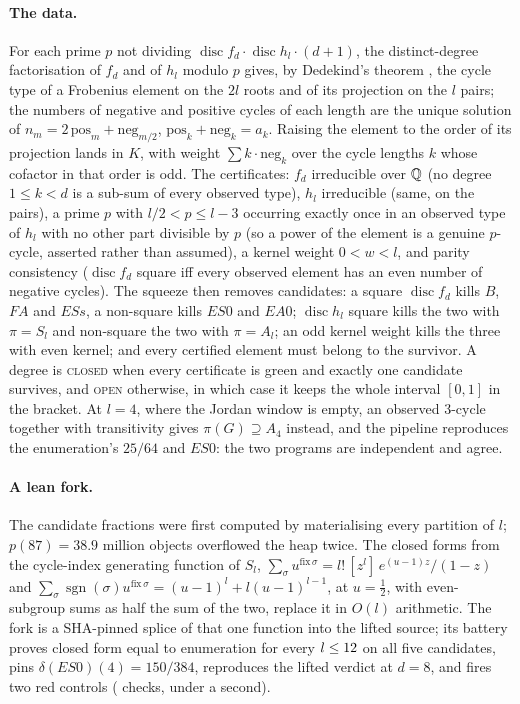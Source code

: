 \documentclass[11pt]{article}
\DeclareMathOperator{\disc}{disc}
\begin{document}
\paragraph{The data.} For each prime $p$ not dividing $\disc f_d\cdot\disc h_l\cdot(d+1)$, the distinct-degree factorisation of $f_d$ and of $h_l$ modulo $p$ gives, by Dedekind's theorem \cite[Ch.~13]{Cox}, the cycle type of a Frobenius element on the $2l$ roots and of its projection on the $l$ pairs; the numbers of negative and positive cycles of each length are the unique solution of $n_m=2\,\mathrm{pos}_m+\mathrm{neg}_{m/2}$, $\mathrm{pos}_k+\mathrm{neg}_k=a_k$. Raising the element to the order of its projection lands in $K$, with weight $\sum k\cdot\mathrm{neg}_k$ over the cycle lengths $k$ whose cofactor in that order is odd. The certificates: $f_d$ irreducible over $\mathbb{Q}$ (no degree $1\le k<d$ is a sub-sum of every observed type), $h_l$ irreducible (same, on the pairs), a prime $p$ with $l/2<p\le l-3$ occurring exactly once in an observed type of $h_l$ with no other part divisible by $p$ (so a power of the element is a genuine $p$-cycle, asserted rather than assumed), a kernel weight $0<w<l$, and parity consistency ($\disc f_d$ square iff every observed element has an even number of negative cycles). The squeeze then removes candidates: a square $\disc f_d$ kills $B$, $FA$ and $ESs$, a non-square kills $ES0$ and $EA0$; $\disc h_l$ square kills the two with $\pi=S_l$ and non-square the two with $\pi=A_l$; an odd kernel weight kills the three with even kernel; and every certified element must belong to the survivor. A degree is \textsc{closed} when every certificate is green and exactly one candidate survives, and \textsc{open} otherwise, in which case it keeps the whole interval $[0,1]$ in the bracket. At $l=4$, where the Jordan window is empty, an observed 3-cycle together with transitivity gives $\pi(G)\supseteq A_4$ instead, and the pipeline reproduces the enumeration's $25/64$ and $ES0$: the two programs are independent and agree.

\paragraph{A lean fork.} The candidate fractions were first computed by materialising every partition of $l$; $p(87)=38.9$ million objects overflowed the heap twice. The closed forms from the cycle-index generating function of $S_l$, $\sum_{\sigma}u^{\mathrm{fix}\,\sigma}=l!\,[z^l]\,e^{(u-1)z}/(1-z)$ and $\sum_\sigma\operatorname{sgn}(\sigma)u^{\mathrm{fix}\,\sigma}=(u-1)^l+l(u-1)^{l-1}$, at $u=\frac12$, with even-subgroup sums as half the sum of the two, replace it in $O(l)$ arithmetic. The fork is a SHA-pinned splice of that one function into the lifted source; its battery proves closed form equal to enumeration for every $l\le12$ on all five candidates, pins $\delta(ES0)(4)=150/384$, reproduces the lifted verdict at $d=8$, and fires two red controls (\LeanPass{} checks, under a second).
\end{document}
